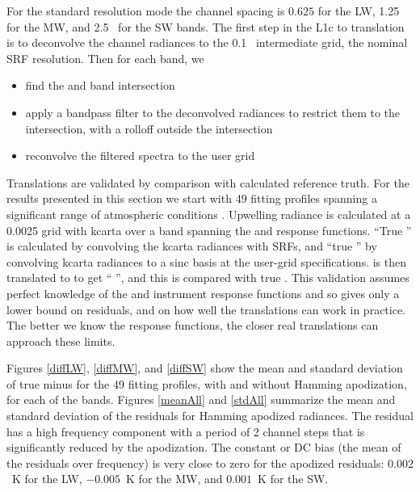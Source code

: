 \documentclass[11pt]{article}
\begin{document}
For the {\cris} standard resolution mode the channel spacing is
$0.625$ {\wn} for the LW, 1.25~{\wn} for the MW, and 2.5~{\wn} for
the SW bands.  The first step in the {\airs} L1c to {\cris}
translation is to deconvolve the {\airs} channel radiances to the
0.1~{\wn} intermediate grid, the nominal {\airs} SRF resolution.
Then for each {\cris} band, we

\begin{itemize}
  \item find the {\airs} and {\cris} band intersection

  \item apply a bandpass filter to the deconvolved {\airs} radiances
    to restrict them to the intersection, with a rolloff outside the
    intersection

  \item reconvolve the filtered spectra to the {\cris} user grid

\end{itemize}

Translations are validated by comparison with calculated reference
truth.  For the results presented in this section we start with 49
fitting profiles spanning a significant range of atmospheric
conditions \cite{sarta1,sarta2}.  Upwelling radiance is calculated
at a 0.0025 {\wn} grid with kcarta \cite{kcarta1} over a band
spanning the {\airs} and {\cris} response functions.  ``True
{\airs}'' is calculated by convolving the kcarta radiances with
{\airs} SRFs, and ``true {\cris}'' by convolving kcarta radiances to
a sinc basis at the {\cris} user-grid specifications.  {\airs} is
then translated to {\cris} to get ``{\airs} {\cris}'', and this is
compared with true {\cris}.  This validation assumes perfect
knowledge of the {\airs} and {\cris} instrument response functions
and so gives only a lower bound on residuals, and on how well the
translations can work in practice.  The better we know the response
functions, the closer real translations can approach these limits.


Figures \ref{diffLW}, \ref{diffMW}, and \ref{diffSW} show the mean
and standard deviation of true {\cris} minus {\airs} {\cris} for the
49 fitting profiles, with and without Hamming apodization, for each
of the {\cris} bands.  Figures \ref{meanAll} and \ref{stdAll}
summarize the mean and standard deviation of the residuals for
Hamming apodized radiances.  The residual has a high frequency
component with a period of 2 channel steps that is significantly
reduced by the apodization.  The constant or DC bias (the mean of
the residuals over frequency) is very close to zero for the apodized
residuals: $0.002$~K for the LW, $-0.005$~K for the MW, and
$0.001$~K for the SW.
\end{document}
